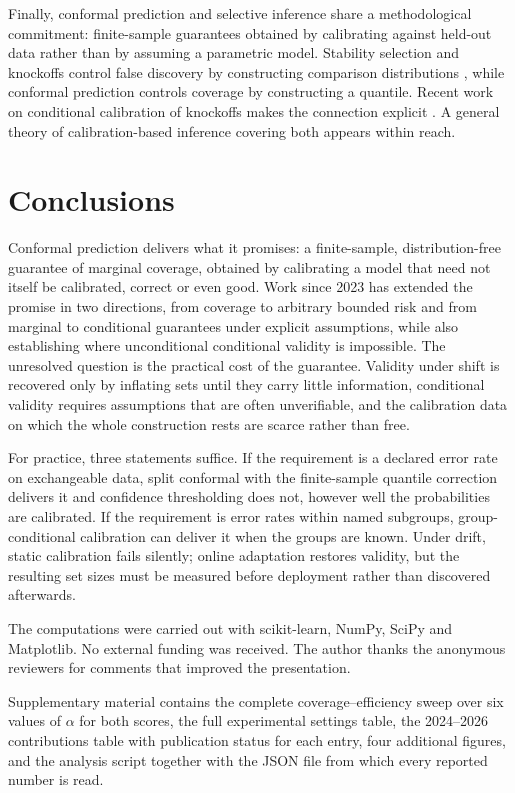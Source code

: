 Finally, conformal prediction and selective inference share a methodological
commitment: finite-sample guarantees obtained by calibrating against held-out data
rather than by assuming a parametric model. Stability selection and knockoffs
control false discovery by constructing comparison distributions
\cite{Meinshausen2010,Barber2015,Candès2018}, while conformal prediction controls
coverage by constructing a quantile. Recent work on conditional calibration of
knockoffs makes the connection explicit \cite{Luo2025}. A general theory of
calibration-based inference covering both appears within reach.

\section{Conclusions}

Conformal prediction delivers what it promises: a finite-sample, distribution-free
guarantee of marginal coverage, obtained by calibrating a model that need not
itself be calibrated, correct or even good. Work since 2023 has extended the
promise in two directions, from coverage to arbitrary bounded risk and from
marginal to conditional guarantees under explicit assumptions, while also
establishing where unconditional conditional validity is impossible. The
unresolved question is the practical cost of the guarantee. Validity under shift
is recovered only by inflating sets until they carry little information,
conditional validity requires assumptions that are often unverifiable, and the
calibration data on which the whole construction rests are scarce rather than free.

For practice, three statements suffice. If the requirement is a declared error
rate on exchangeable data, split conformal with the finite-sample quantile
correction delivers it and confidence thresholding does not, however well the
probabilities are calibrated. If the requirement is error rates within named
subgroups, group-conditional calibration can deliver it when the groups are known.
Under drift, static calibration fails silently; online adaptation restores
validity, but the resulting set sizes must be measured before deployment rather
than discovered afterwards.

\begin{acknowledgements}
The computations were carried out with scikit-learn, NumPy, SciPy and Matplotlib.
No external funding was received. The author thanks the anonymous reviewers for
comments that improved the presentation.
\end{acknowledgements}

\begin{supptables}
Supplementary material contains the complete coverage--efficiency sweep over six
values of $\alpha$ for both scores, the full experimental settings table, the
2024--2026 contributions table with publication status for each entry, four
additional figures, and the analysis script together with the JSON file from which
every reported number is read.
\end{supptables}
